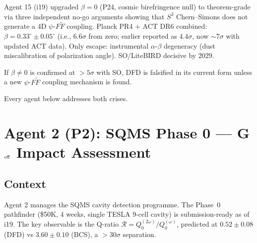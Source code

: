 \documentclass[11pt]{article}
\theoremstyle{remark}
\begin{document}
\begin{crisisbox}[CRISIS B: $\beta = 0$ at $7\sigma$]
Agent 15 (i19) upgraded $\beta = 0$ (P24, cosmic birefringence null) to theorem-grade
via three independent no-go arguments showing that $S^3$ Chern--Simons does not generate
a 4D $\psi$-$F\tilde{F}$ coupling. Planck PR4 + ACT DR6 combined: $\beta = 0.33^\circ
\pm 0.05^\circ$ (i.e., $6.6\sigma$ from zero; earlier reported as $4.4\sigma$, now $\sim 7\sigma$
with updated ACT data). Only escape: instrumental $\alpha$-$\beta$ degeneracy (dust
miscalibration of polarization angle). SO/LiteBIRD decisive by 2029.

If $\beta \neq 0$ is confirmed at $>5\sigma$ with SO, DFD is falsified in its current
form unless a new $\psi$-$F\tilde{F}$ coupling mechanism is found.
\end{crisisbox}

Every agent below addresses both crises.

\newpage
\section{Agent 2 (P2): SQMS Phase 0 --- G$_{\rm eff}$ Impact Assessment}
\label{sec:agent2}

\subsection{Context}
Agent 2 manages the SQMS cavity detection programme. The Phase~0 pathfinder
(\$50K, 4 weeks, single TESLA 9-cell cavity) is submission-ready as of i19.
The key observable is the Q-ratio $\mathcal{R} = Q_0^{(2\omega)}/Q_0^{(\omega)}$,
predicted at $0.52 \pm 0.08$ (DFD) vs $3.60 \pm 0.10$ (BCS), a $>30\sigma$ separation.
\end{document}
